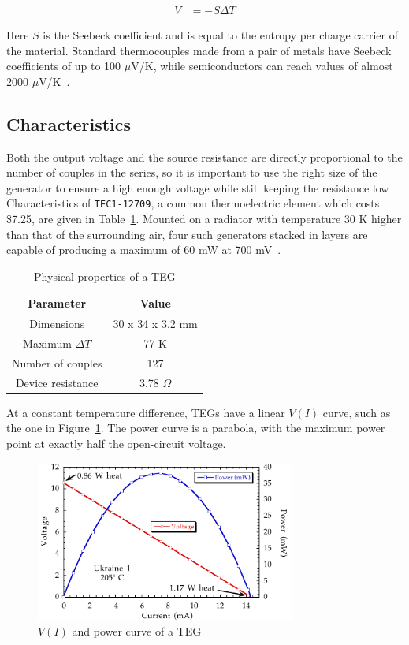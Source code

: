 \documentclass[a4paper,10pt]{article}
\begin{document}
\begin{align}
 V &= -S \Delta T
\label{eq:seebeck}
\end{align}

Here $S$ is the Seebeck coefficient and is equal to the entropy per charge carrier of the material. Standard thermocouples made from a pair of metals have Seebeck coefficients of up to 100 $\mu$V/K, while semiconductors can reach values of almost 2000 $\mu$V/K~\cite{wiki:thermo,ec:seebeck}. 

\subsection{Characteristics}

Both the output voltage and the source resistance are directly proportional to the number of couples in the series, so it is important to use the right size of the generator to ensure a high enough voltage while still keeping the resistance low~\cite{Salerno10}. Characteristics of \texttt{TEC1-12709}, a common thermoelectric element which costs \$7.25, are given in Table~\ref{tab:teg-radiator}. Mounted on a radiator with temperature 30 K higher than that of the surrounding air, four such generators stacked in layers are capable of producing a maximum of 60 mW at 700 mV~\cite{teg-wsn-ieee}. 

\begin{table}[h]
  \centering
  \begin{tabular}{|c|c|}
\hline
    Parameter & Value \\
\hline
Dimensions & 30 x 34 x 3.2 mm \\
Maximum $\Delta T$ & 77 K \\
Number of couples & 127 \\
Device resistance & 3.78 $\Omega$ \\
\hline
  \end{tabular}
\caption{Physical properties of a \ac{TEG}}
\label{tab:teg-radiator}
\end{table}

At a constant temperature difference, \acp{TEG} have a linear $V(I)$ curve, such as the one in Figure~\ref{fig:teg-curve}. The power curve is a parabola, with the maximum power point at exactly half the open-circuit voltage. 

\begin{figure}[h]
\centering
 \includegraphics[height=150pt]{./Slike/TEG-curve}
\caption{$V(I)$ and power curve of a \ac{TEG}~\cite{teg-curve}}
\label{fig:teg-curve}
\end{figure}
\end{document}

